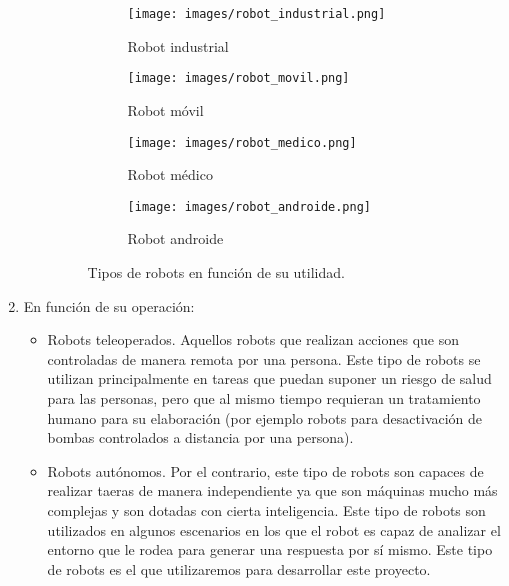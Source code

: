 \documentclass{report}
\begin{document}
\begin{enumerate}
\begin{itemize}
\begin{figure}[h]
\centering
  \begin{subfigure}[b]{0.25\textwidth}
    \texttt{[image: images/robot\_industrial.png]}
    \caption{Robot industrial}
    \label{fig:f1}
  \end{subfigure}
    \begin{subfigure}[b]{0.25\textwidth}
    \texttt{[image: images/robot\_movil.png]}
    \caption{Robot móvil}
    \label{fig:f2}
  	\end{subfigure}
  	\begin{subfigure}[b]{0.25\textwidth}
    \texttt{[image: images/robot\_medico.png]}
    \caption{Robot médico}
    \label{fig:f3}
  	\end{subfigure}
  	\begin{subfigure}[b]{0.25\textwidth}
    \texttt{[image: images/robot\_androide.png]}
    \caption{Robot androide}
    \label{fig:f3}
  	\end{subfigure}
  	\caption{Tipos de robots en función de su utilidad.}
\end{figure}
	\end{itemize}


	\item En función de su operación:
	\begin{itemize}
		\item Robots teleoperados. Aquellos robots que realizan acciones que son controladas de manera remota por una persona. Este tipo de robots se utilizan principalmente en tareas que puedan suponer un riesgo de salud para las personas, pero que al mismo tiempo requieran un tratamiento humano para su elaboración (por ejemplo robots para desactivación de bombas controlados a distancia por una persona).
		
		\item Robots autónomos. Por el contrario, este tipo de robots son capaces de realizar taeras de manera independiente ya que son máquinas mucho más complejas y son dotadas con cierta inteligencia. Este tipo de robots son utilizados en algunos escenarios en los que el robot es capaz de analizar el entorno que le rodea para generar una respuesta por sí mismo. Este tipo de robots es el que utilizaremos para desarrollar este proyecto.
	\end{itemize}
\end{enumerate}
\end{document}
